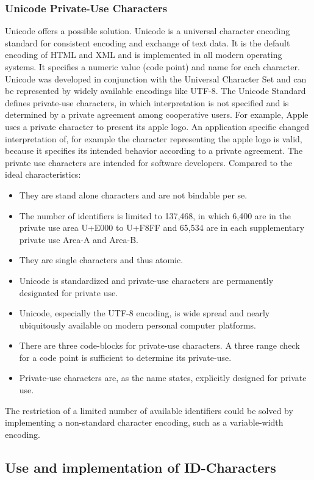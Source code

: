 \subsubsection{Unicode Private-Use Characters}
Unicode \cite{Unicode} offers a possible solution. Unicode is a universal character encoding standard for consistent encoding and exchange of text data. It is the default encoding of HTML and XML and is implemented in all modern operating systems. It specifies a numeric value (code point) and name for each character. Unicode was developed in conjunction with the Universal Character Set and can be represented by widely available encodings like UTF-8. The Unicode Standard defines private-use characters, in which interpretation is not specified and is determined by a private agreement among cooperative users. For example, Apple uses a private character to present its apple logo. An application specific changed interpretation of, for example the character representing the apple logo is valid, because it specifies its intended behavior according to a private agreement.
The private use characters are intended for software developers. Compared to the ideal characteristics:
\begin{itemize}
	\item They are stand alone characters and are not bindable per se.
	\item The number of identifiers is limited to 137,468, in which 6,400 are in the private use area U+E000 to U+F8FF and 65,534 are in each supplementary private use Area-A and Area-B. 
	\item They are single characters and thus atomic. 
	\item Unicode is standardized and private-use characters are permanently designated for private use.
	\item Unicode, especially the UTF-8 encoding, is wide spread and nearly ubiquitously available on modern personal computer platforms.
	\item There are three code-blocks for private-use characters. A three range check for a code point is sufficient to determine its private-use.
	\item Private-use characters are, as the name states, explicitly designed for private use.
\end{itemize}
The restriction of a limited number of available identifiers could be solved by implementing a non-standard character encoding, such as a variable-width encoding.


\subsection{Use and implementation of ID-Characters}
 
